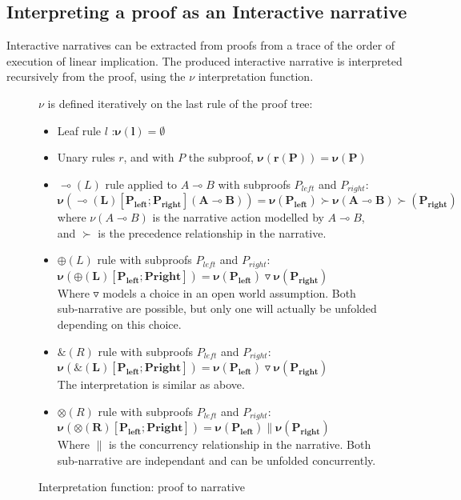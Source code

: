 \documentclass[runningheads,a4paper]{llncs}
\begin{document}
\subsection{Interpreting a proof as an Interactive narrative}
Interactive narratives can be extracted from proofs from a trace of the order of execution of linear implication. The produced interactive narrative is interpreted recursively from the proof, using the $\nu$ interpretation function.
\begin{figure}
$\nu$ is defined iteratively on the last rule of the proof tree:
\begin{itemize}
\item Leaf rule $l$ :$\mathbf{\nu(l) = \emptyset}$
\item Unary rules $r$, and with $P$ the subproof, $\mathbf{\nu(r(P)) = \nu(P)}$
\item $\multimap(L)$ rule applied to $A\multimap B$ with subproofs $P_{left}$ and $P_{right}$:\\
$\mathbf{\nu(\multimap(L)[P_{left};P_{right}](A\multimap B)) = \nu(P_{left}) \succ \nu(A \multimap B) \succ(P_{right})}$\\
where $\nu(A \multimap B)$ is the narrative action modelled by $A \multimap B$, and $\succ$ is the precedence relationship in the narrative.
\item $\oplus (L)$ rule with subproofs $P_{left}$ and $P_{right}$:\\ 
$\mathbf{\nu(\oplus(L)[P_{left};P{right}]) = \nu(P_{left}) \triangledown \nu(P_{right})}$\\ 
Where $\triangledown$ models a choice in an open world assumption. Both sub-narrative are possible, but only one will actually be unfolded depending on this choice.
\item $\& (R)$ rule with subproofs $P_{left}$ and $P_{right}$:\\ 
$\mathbf{\nu(\&(L)[P_{left};P{right}]) = \nu(P_{left}) \triangledown \nu(P_{right})}$\\ 
The interpretation is similar as above.
\item $\otimes (R)$ rule with subproofs $P_{left}$ and $P_{right}$:\\ 
$\mathbf{\nu(\otimes(R)[P_{left};P{right}]) = \nu(P_{left}) \| \nu(P_{right})}$ \\
Where $\|$ is the concurrency relationship in the narrative. Both sub-narrative are independant and can be unfolded concurrently.
\end{itemize}
\caption{Interpretation function: proof to narrative\label{interpretation}}
\end{figure}
\end{document}
